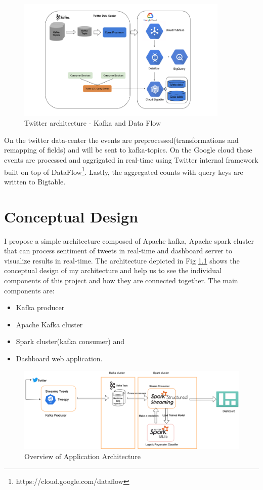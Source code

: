 \documentclass[12pt,a4paper]{report}
\begin{document}
\begin{figure}[h]
\centering
\includegraphics[width=0.9\textwidth]{images/twitter-stack.png}
\caption{Twitter architecture - Kafka and Data Flow}
\label{fig:twitterStack}
\end{figure}

On the twitter data-center the events are preprocessed(transformations and remapping of fields) and will be sent to kafka-topics. On the Google cloud these events are processed and aggrigated in real-time using Twitter internal framework built on top of DataFlow\footnote{https://cloud.google.com/dataflow}. Lastly, the aggregated counts with query keys are written to Bigtable.

\chapter{Conceptual Design}
I propose a simple architecture composed of Apache kafka, Apache spark cluster that can process sentiment of tweets in real-time and dashboard server to visualize results in real-time. The architecture depicted in Fig \ref{fig:application_architecture} shows the conceptual design of my architecture and help us to see the individual components of this project and how they are connected together. The main components are:
\begin{itemize}
  \item Kafka producer
  \item Apache Kafka cluster
  \item Spark cluster(kafka consumer) and
  \item Dashboard web application.
\end{itemize}

\begin{figure}[h]
\centering
\includegraphics[width=1\textwidth]{images/Tweet sentimenr - architecture.png}
\caption{Overview of Application Architecture}
\label{fig:application_architecture}
\end{figure}
\end{document}
